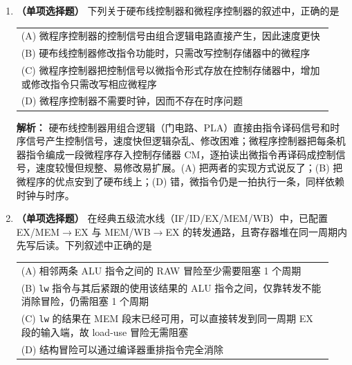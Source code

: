 \begin{enumerate}
\ifshowsolutions\par\noindent\textbf{解析：} 单总线在同一时钟周期内只能传送一个数据，而 ALU 做加法必须同时获得两个操作数。做法是：先让一个操作数经总线送入暂存器 Y 并锁存，下一周期再把另一个操作数送上总线接到 ALU 的 B 端，此时 ALU 的 A 端仍保持 Y 的值，一拍完成运算。因此 Y 是操作数锁存器，作用是化解总线带宽不足，而不是加快 ALU 本身的速度，(A) 错。状态标志由 PSW 保存，(C) 错；指令由 IR 保存，(D) 错。\else \answerarea \fi

\item \textbf{（单项选择题）} 下列关于硬布线控制器和微程序控制器的叙述中，正确的是
\begin{center}
\begin{tabular}{@{}p{0.94\linewidth}@{}}
(A) 微程序控制器的控制信号由组合逻辑电路直接产生，因此速度更快 \\[4pt]
(B) 硬布线控制器修改指令功能时，只需改写控制存储器中的微程序 \\[4pt]
(C) 微程序控制器把控制信号以微指令形式存放在控制存储器中，增加或修改指令只需改写相应微程序 \\[4pt]
(D) 微程序控制器不需要时钟，因而不存在时序问题
\end{tabular}
\end{center}

\ifshowsolutions\par\noindent\textbf{解析：} 硬布线控制器用组合逻辑（门电路、PLA）直接由指令译码信号和时序信号产生控制信号，速度快但逻辑杂乱、修改困难；微程序控制器把每条机器指令编成一段微程序存入控制存储器 CM，逐拍读出微指令再译码成控制信号，速度较慢但规整、易修改易扩展。(A) 把两者的实现方式说反了；(B) 把微程序的优点安到了硬布线上；(D) 错，微指令仍是一拍执行一条，同样依赖时钟与时序。\else \answerarea \fi

\item \textbf{（单项选择题）} 在经典五级流水线（IF/ID/EX/MEM/WB）中，已配置 EX/MEM$\to$EX 与 MEM/WB$\to$EX 的转发通路，且寄存器堆在同一周期内先写后读。下列叙述中正确的是
\begin{center}
\begin{tabular}{@{}p{0.94\linewidth}@{}}
(A) 相邻两条 ALU 指令之间的 RAW 冒险至少需要阻塞 1 个周期 \\[4pt]
(B) \texttt{lw} 指令与其后紧跟的使用该结果的 ALU 指令之间，仅靠转发不能消除冒险，仍需阻塞 1 个周期 \\[4pt]
(C) \texttt{lw} 的结果在 MEM 段末已经可用，可以直接转发到同一周期 EX 段的输入端，故 load-use 冒险无需阻塞 \\[4pt]
(D) 结构冒险可以通过编译器重排指令完全消除
\end{tabular}
\end{center}


\end{enumerate}
